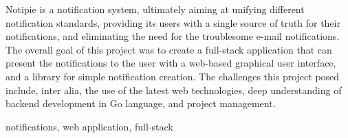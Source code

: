 \abstract
Notipie is a notification system,
ultimately aiming at unifying
different notification standards,
providing its users with a single source of truth
for their notifications,
and eliminating the need
for the troublesome e-mail notifications.
The overall goal of this project
was to create a full-stack application
that can present the notifications to the user
with a web-based graphical user interface,
and a library
for simple notification creation.
The challenges this project posed include,
inter alia,
the use of the latest web technologies,
deep understanding of backend development in Go language,
and project management.

\keywords notifications, web application, full-stack
